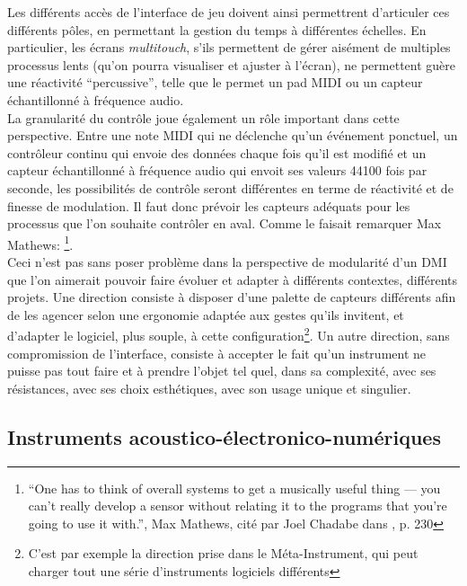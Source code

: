 \indent Les différents accès de l'interface de jeu doivent ainsi permettrent d'articuler ces différents pôles, en permettant la gestion du temps à différentes échelles. En particulier, les écrans \textit{multitouch}, s'ils permettent de gérer aisément de multiples processus lents (qu'on pourra visualiser et ajuster à l'écran), ne permettent guère une réactivité ``percussive'', telle que le permet un pad \gls{MIDI} ou un capteur échantillonné à fréquence audio.\\
\indent La granularité du contrôle joue également un rôle important dans cette perspective. Entre une note \gls{MIDI} qui ne déclenche qu'un événement ponctuel, un contrôleur continu qui envoie des données chaque fois qu'il est modifié et un capteur échantillonné à fréquence audio qui envoit ses valeurs 44100 fois par seconde, les possibilités de contrôle seront différentes en terme de réactivité et de finesse de modulation. Il faut donc prévoir les capteurs adéquats pour les processus que l'on souhaite contrôler en aval. Comme le faisait remarquer Max Mathews: \footnote{``One has to think of overall systems to get a musically useful thing — you can't really develop a sensor without relating it to the programs that you're going to use it with.'', Max Mathews, cité par Joel Chadabe dans \cite{chadabe_electric_1996}, p. 230}.\\
\indent Ceci n'est pas sans poser problème dans la perspective de modularité d'un \gls{DMI} que l'on aimerait pouvoir faire évoluer et adapter à différents contextes, différents projets. Une direction consiste à disposer d'une palette de capteurs différents afin de les agencer selon une ergonomie adaptée aux gestes qu'ils invitent, et d'adapter le logiciel, plus souple, à cette configuration\footnote{C'est par exemple la direction prise dans le Méta-Instrument, qui peut charger tout une série d'instruments logiciels différents}. Un autre direction, sans compromission de l'interface, consiste à accepter le fait qu'un instrument ne puisse pas tout faire et à prendre l'objet tel quel, dans sa complexité, avec ses résistances, avec ses choix esthétiques, avec son usage unique et singulier. 

\subsection{Instruments acoustico-électronico-numériques}


